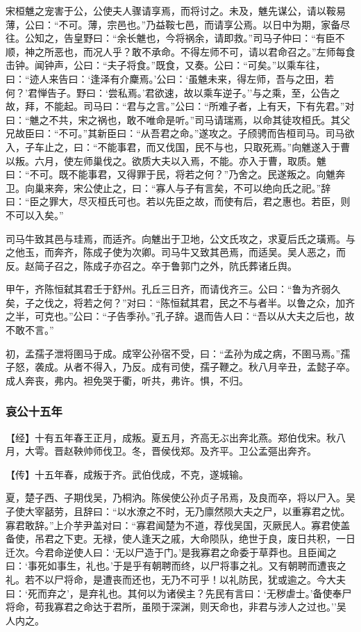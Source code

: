 \documentclass[]{article}
\begin{document}
宋桓魋之宠害于公，公使夫人骤请享焉，而将讨之。未及，魋先谋公，请以鞍易薄，公曰：``不可。薄，宗邑也。''乃益鞍七邑，而请享公焉。以日中为期，家备尽往。公知之，告皇野曰：``余长魋也，今将祸余，请即救。''司马子仲曰：``有臣不顺，神之所恶也，而况人乎？敢不承命。不得左师不可，请以君命召之。''左师每食击钟。闻钟声，公曰：``夫子将食。''既食，又奏。公曰：``可矣。''以乘车往，曰：``迹人来告曰：`逢泽有介麇焉。'公曰：`虽魋未来，得左师，吾与之田，若何？'君惮告子。野曰：`尝私焉。'君欲速，故以乘车逆子。''与之乘，至，公告之故，拜，不能起。司马曰：``君与之言。''公曰：``所难子者，上有天，下有先君。''对曰：``魋之不共，宋之祸也，敢不唯命是听。''司马请瑞焉，以命其徒攻桓氏。其父兄故臣曰：``不可。''其新臣曰：``从吾君之命。''遂攻之。子颀骋而告桓司马。司马欲入，子车止之，曰：``不能事君，而又伐国，民不与也，只取死焉。''向魋遂入于曹以叛。六月，使左师巢伐之。欲质大夫以入焉，不能。亦入于曹，取质。魋曰：``不可。既不能事君，又得罪于民，将若之何？''乃舍之。民遂叛之。向魋奔卫。向巢来奔，宋公使止之，曰：``寡人与子有言矣，不可以绝向氏之祀。''辞曰：``臣之罪大，尽灭桓氏可也。若以先臣之故，而使有后，君之惠也。若臣，则不可以入矣。''

司马牛致其邑与珪焉，而适齐。向魋出于卫地，公文氏攻之，求夏后氏之璜焉。与之他玉，而奔齐，陈成子使为次卿。司马牛又致其邑焉，而适吴。吴人恶之，而反。赵简子召之，陈成子亦召之。卒于鲁郭门之外，阬氏葬诸丘舆。

甲午，齐陈恒弑其君壬于舒州。孔丘三日齐，而请伐齐三。公曰：``鲁为齐弱久矣，子之伐之，将若之何？''对曰：``陈恒弑其君，民之不与者半。以鲁之众，加齐之半，可克也。''公曰：``子告季孙。''孔子辞。退而告人曰：``吾以从大夫之后也，故不敢不言。''

初，孟孺子泄将圉马于成。成宰公孙宿不受，曰：``孟孙为成之病，不圉马焉。''孺子怒，袭成。从者不得入，乃反。成有司使，孺子鞭之。秋八月辛丑，孟懿子卒。成人奔丧，弗内。袒免哭于衢，听共，弗许。惧，不归。

\hypertarget{header-n3204}{%
\subsubsection{哀公十五年}\label{header-n3204}}

【经】十有五年春王正月，成叛。夏五月，齐高无ぶ出奔北燕。郑伯伐宋。秋八月，大雩。晋赵鞅帅师伐卫。冬，晋侯伐郑。及齐平。卫公孟彄出奔齐。

【传】十五年春，成叛于齐。武伯伐成，不克，遂城输。

夏，楚子西、子期伐吴，乃桐汭。陈侯使公孙贞子吊焉，及良而卒，将以尸入。吴子使大宰嚭劳，且辞曰：``以水潦之不时，无乃廪然陨大夫之尸，以重寡君之忧。寡君敢辞。''上介芋尹盖对曰：``寡君闻楚为不道，荐伐吴国，灭厥民人。寡君使盖备使，吊君之下吏。无禄，使人逢天之戚，大命陨队，绝世于良，废日共积，一日迁次。今君命逆使人曰：`无以尸造于门。'是我寡君之命委于草莽也。且臣闻之曰：`事死如事生，礼也。'于是乎有朝聘而终，以尸将事之礼。又有朝聘而遭丧之礼。若不以尸将命，是遭丧而还也，无乃不可乎！以礼防民，犹或逾之。今大夫曰：`死而弃之'，是弃礼也。其何以为诸侯主？先民有言曰：`无秽虐士。'备使奉尸将命，苟我寡君之命达于君所，虽陨于深渊，则天命也，非君与涉人之过也。''吴人内之。
\end{document}
